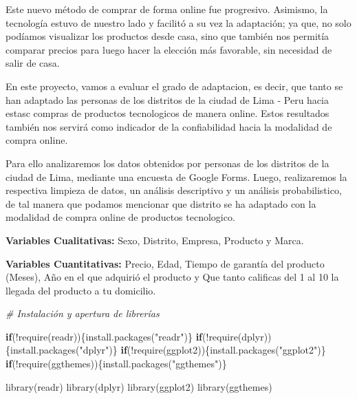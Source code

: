 \documentclass[
]{article}
\newenvironment{Shaded}{\begin{snugshade}}{\end{snugshade}}
\newcommand{\CommentTok}[1]{\textcolor[rgb]{0.56,0.35,0.01}{\textit{#1}}}
\newcommand{\ControlFlowTok}[1]{\textcolor[rgb]{0.13,0.29,0.53}{\textbf{#1}}}
\newcommand{\FunctionTok}[1]{\textcolor[rgb]{0.00,0.00,0.00}{#1}}
\newcommand{\NormalTok}[1]{#1}
\newcommand{\SpecialCharTok}[1]{\textcolor[rgb]{0.00,0.00,0.00}{#1}}
\newcommand{\StringTok}[1]{\textcolor[rgb]{0.31,0.60,0.02}{#1}}
\begin{document}
Este nuevo método de comprar de forma online fue progresivo. Asimismo,
la tecnología estuvo de nuestro lado y facilitó a su vez la adaptación;
ya que, no solo podíamos visualizar los productos desde casa, sino que
también nos permitía comparar precios para luego hacer la elección más
favorable, sin necesidad de salir de casa.

En este proyecto, vamos a evaluar el grado de adaptacion, es decir, que
tanto se han adaptado las personas de los distritos de la ciudad de Lima
- Peru hacia estasc compras de productos tecnologicos de manera online.
Estos resultados también nos servirá como indicador de la confiabilidad
hacia la modalidad de compra online.

Para ello analizaremos los datos obtenidos por personas de los distritos
de la ciudad de Lima, mediante una encuesta de Google Forms. Luego,
realizaremos la respectiva limpieza de datos, un análisis descriptivo y
un análisis probabilistico, de tal manera que podamos mencionar que
distrito se ha adaptado con la modalidad de compra online de productos
tecnologico.

\textbf{Variables Cualitativas:} Sexo, Distrito, Empresa, Producto y
Marca.

\textbf{Variables Cuantitativas:} Precio, Edad, Tiempo de garantía del
producto (Meses), Año en el que adquirió el producto y Que tanto
calificas del 1 al 10 la llegada del producto a tu domicilio.

\begin{Shaded}
\begin{Highlighting}[]
\CommentTok{\# Instalación y apertura de librerías}

\ControlFlowTok{if}\NormalTok{(}\SpecialCharTok{!}\FunctionTok{require}\NormalTok{(readr))\{}\FunctionTok{install.packages}\NormalTok{(}\StringTok{"readr"}\NormalTok{)\}}
\ControlFlowTok{if}\NormalTok{(}\SpecialCharTok{!}\FunctionTok{require}\NormalTok{(dplyr))\{}\FunctionTok{install.packages}\NormalTok{(}\StringTok{"dplyr"}\NormalTok{)\}}
\ControlFlowTok{if}\NormalTok{(}\SpecialCharTok{!}\FunctionTok{require}\NormalTok{(ggplot2))\{}\FunctionTok{install.packages}\NormalTok{(}\StringTok{"ggplot2"}\NormalTok{)\}}
\ControlFlowTok{if}\NormalTok{(}\SpecialCharTok{!}\FunctionTok{require}\NormalTok{(ggthemes))\{}\FunctionTok{install.packages}\NormalTok{(}\StringTok{"ggthemes"}\NormalTok{)\}}

\FunctionTok{library}\NormalTok{(readr)}
\FunctionTok{library}\NormalTok{(dplyr)}
\FunctionTok{library}\NormalTok{(ggplot2)}
\FunctionTok{library}\NormalTok{(ggthemes)}
\end{Highlighting}
\end{Shaded}
\end{document}
